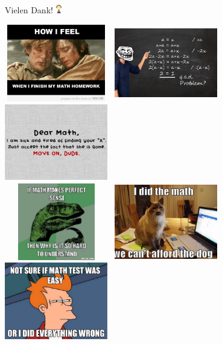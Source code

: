 \documentclass[12pt,a4paper,ngerman]{scrartcl}
\begin{document}
\begin{center}\large Vielen Dank! \includegraphics[height=1em]{smile}

\includegraphics[height=127px,width=170px]{tumblr_lwq9efEyjK1qfwtbao1_500}
\,
\includegraphics[height=127px,width=170px]{math-troll}
\,
\includegraphics[height=127px,width=170px]{Free_Smiles_Dear_Math} \\[0.4cm]
\includegraphics[height=127px,width=170px]{phil}
\,
\includegraphics[height=127px,width=170px]{3-ihasafunny-cat-did-the-math-and-you-cannot-afford-the-dog1}
\,
\includegraphics[height=127px,width=170px]{tumblr_lurqp6jVCU1qfv9pvo1_500}
\end{center}
\end{document}
